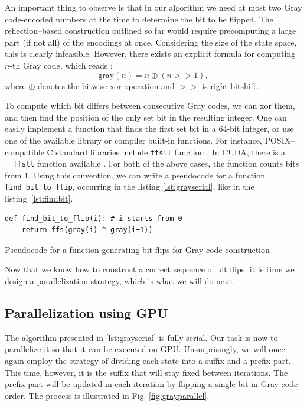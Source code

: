 An important thing to observe is that in our algorithm we need at most two Gray
code-encoded numbers at the time to determine the bit to be flipped. The
reflection--based construction outlined so far would require precomputing a
large part (if not all) of the encodings at once. Considering the size of the
state space, this is clearly infeasible. However, there exists an explicit
formula for computing $n$-th Gray code, which reads \cite{grayalgo}:
\begin{equation}
  \mbox{gray}(n) = n \oplus (n >> 1),
\end{equation}
where $\oplus$ denotes the bitwise xor operation and $>>$ is right bitshift.

To compute which bit differs between consecutive Gray codes, we can xor them,
and then find the position of the only set bit in the resulting integer. One
can easily implement a function that finds the first set bit in a 64-bit
integer, or use one of the available library or compiler built-in functions.
For instance, POSIX--compatible C standard libraries include \texttt{ffsll}
function \cite{ffs}. In CUDA, there is a \texttt{\_\_ffsll} function available
\cite{CUDAguide}. For both of the above cases, the function counts bits from
$1$. Using this convention, we can write a pseudocode for a function
\texttt{find\_bit\_to\_flip}, occurring in the listing \ref{lst:grayserial}, like in the
listing~\ref{lst:findbit}.

\begin{listing}
  \begin{verbatim}
def find_bit_to_flip(i): # i starts from 0
    return ffs(gray(i) ^ gray(i+1))
\end{verbatim}
  \caption{Pseudocode for a function generating bit flips for Gray code construction}
  \label{lst:findbit}
\end{listing}

Now that we know how to construct a correct sequence of bit flips, it is time
we design a parallelization strategy, which is what we will do next.

\subsection{Parallelization using GPU}
The algorithm presented in \ref{lst:grayserial} is fully serial. Our task is
now to parallelize it so that it can be executed on GPU. Unsurprisingly, we
will once again employ the strategy of dividing each state into a suffix and a
prefix part. This time, however, it is the suffix that will stay fixed between
iterations. The prefix part will be updated in each iteration by flipping a
single bit in Gray code order. The process is illustrated in Fig.
\ref{fig:grayparallel}.

